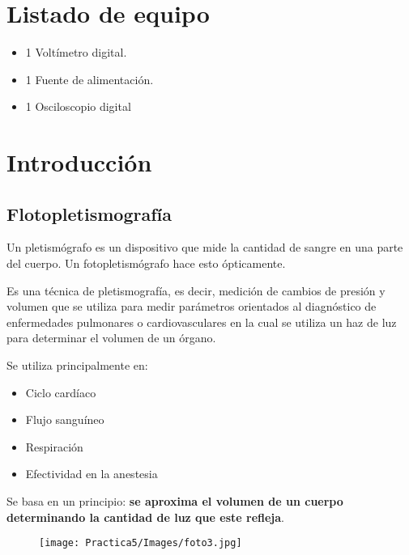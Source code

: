 \documentclass[12pt]{article}
\begin{document}
    \section{Listado de equipo}
      
        \begin{itemize}
            \item 1 Voltímetro digital.
            \item 1 Fuente de alimentación.
            \item 1 Osciloscopio digital
        \end{itemize}
        
    

    \section{Introducción}
        \subsection{Flotopletismografía}
            Un pletismógrafo es un dispositivo que mide la cantidad de sangre en una parte del cuerpo. Un fotopletismógrafo hace esto ópticamente. 
            
            Es una técnica de pletismografía, es decir, medición de cambios de presión y volumen que se utiliza para medir parámetros orientados al diagnóstico de enfermedades pulmonares o cardiovasculares en la cual se utiliza un haz de luz para determinar el volumen de un órgano.
            
            Se utiliza principalmente en:
            \begin{itemize}
                \item Ciclo cardíaco 
                \item Flujo sanguíneo
                \item Respiración
                \item Efectividad en la anestesia
            \end{itemize}
            
            Se basa en un principio: \textbf{se aproxima el volumen de un cuerpo determinando la cantidad de luz que este refleja}.
            
            \begin{figure}[h!]
                \centering
                \texttt{[image: Practica5/Images/foto3.jpg]}
            \end{figure}
            
\end{document}
